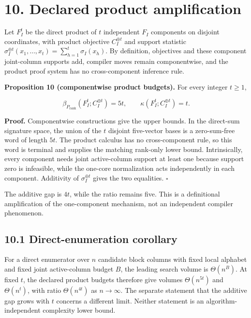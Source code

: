 \documentclass[11pt]{article}
\begin{document}
\section*{10. Declared product amplification}\label{declared-product-amplification}

Let \(F_I^t\) be the direct product of \(t\) independent \(F_I\) components on disjoint coordinates, with product objective \(C_I^{\oplus t}\) and support statistic \(\sigma_I^{\oplus t}(x_1,\ldots,x_t)=\sum_{h=1}^t\sigma_I(x_h)\). By definition, objectives and these component joint-column supports add, compiler moves remain componentwise, and the product proof system has no cross-component inference rule.

\textbf{Proposition 10 (componentwise product budgets).} For every integer \(t\geq 1\),

\[
\beta_{P_{\mathrm{rank}}}(F_I^t;C_I^{\oplus t})=5t,
\qquad
\kappa(F_I^t;C_I^{\oplus t})=t.
\]

\textbf{Proof.} Componentwise constructions give the upper bounds. In the direct-sum signature space, the union of the \(t\) disjoint five-vector bases is a zero-sum-free word of length \(5t\). The product calculus has no cross-component rule, so this word is terminal and supplies the matching rank-only lower bound. Intrinsically, every component needs joint active-column support at least one because support zero is infeasible, while the one-core normalization acts independently in each component. Additivity of \(\sigma_I^{\oplus t}\) gives the two equalities. \(\square\)

The additive gap is \(4t\), while the ratio remains five. This is a definitional amplification of the one-component mechanism, not an independent compiler phenomenon.

\subsection*{10.1 Direct-enumeration corollary}\label{direct-enumeration-corollary}

For a direct enumerator over \(n\) candidate block columns with fixed local alphabet and fixed joint active-column budget \(B\), the leading search volume is \(\Theta(n^B)\). At fixed \(t\), the declared product budgets therefore give volumes \(\Theta(n^{5t})\) and \(\Theta(n^t)\), with ratio \(\Theta(n^{4t})\) as \(n\to\infty\). The separate statement that the additive gap grows with \(t\) concerns a different limit. Neither statement is an algorithm-independent complexity lower bound.
\end{document}
